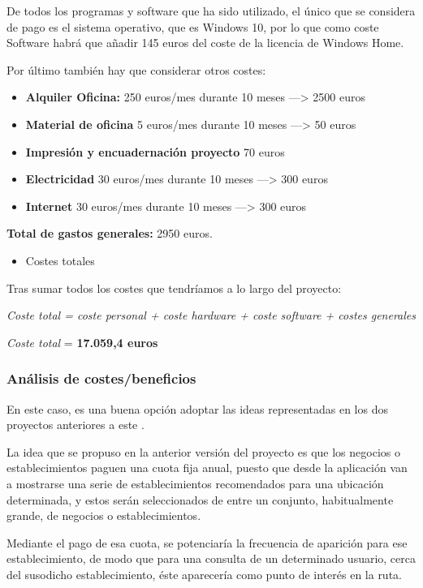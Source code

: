 De todos los programas y software que ha sido utilizado, el único que se considera de pago es el sistema operativo, que es Windows 10, por lo que como coste Software habrá que añadir 145 euros del coste de la licencia de Windows Home.

Por último también hay que considerar otros costes:
\begin{itemize}
\item \textbf{Alquiler Oficina:} 250 euros/mes durante 10 meses ---> 2500 euros
\item \textbf{Material de oficina} 5 euros/mes durante 10 meses ---> 50 euros
\item \textbf{Impresión y encuadernación proyecto} 70 euros
\item \textbf{Electricidad} 30 euros/mes durante 10 meses ---> 300 euros
\item \textbf{Internet} 30 euros/mes durante 10 meses ---> 300 euros
\end{itemize}

\textbf{Total de gastos generales:} 2950 euros.

\begin{itemize}
\item Costes totales
\end{itemize}

Tras sumar todos los costes que tendríamos a lo largo del proyecto:

\textit{Coste total = coste personal + coste hardware + coste software + costes generales}

\textit{Coste total} = \textbf{17.059,4 euros}


\subsubsection{Análisis de costes/beneficios}

En este caso, es una buena opción adoptar las ideas representadas en los dos proyectos anteriores a este \cite{tfg1} \cite{tfm1}.

La idea que se propuso en la anterior versión del proyecto es que los negocios o establecimientos paguen una cuota fija anual, puesto que desde la aplicación van a mostrarse una serie de establecimientos recomendados para una ubicación determinada, y estos serán seleccionados de entre un conjunto, habitualmente grande, de negocios o establecimientos.

Mediante el pago de esa cuota, se potenciaría la frecuencia de aparición para ese establecimiento, de modo que para una consulta de un determinado usuario, cerca del susodicho establecimiento, éste aparecería como punto de interés en la ruta.

